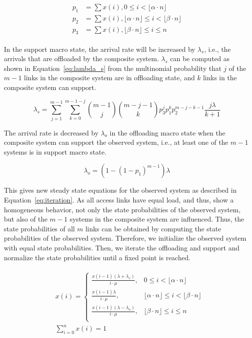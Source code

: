 \begin{align}
\begin{split}
p_1 &= \sum x(i),  0 \leq i < \lfloor\alpha\cdot n\rfloor \\
p_2 &= \sum x(i), \lfloor\alpha\cdot n\rfloor\leq i < \lfloor\beta\cdot n\rfloor \\
p_3 &= \sum x(i), \lfloor\beta\cdot n\rfloor \leq i \leq n
\end{split}
\label{eq:macro}
\end{align}

In the support macro state, the arrival rate will be increased by $\lambda_s$, i.e., the arrivals that are offloaded by the composite system. $\lambda_s$ can be computed as shown in Equation~\ref{eq:lambda_s} from the multinomial probability that $j$ of the $m-1$ links in the composite system are in offloading state, and $k$ links in the composite system can support.

\small
\begin{equation}
\lambda_{s} = \sum_{j=1}^{m-1}\sum_{k=0}^{m-1-j} \binom{m-1}{j}\binom{m-j-1}{k}p^j_3 p^k_1 p_2^{m-j-k-1}\frac{j\lambda}{k+1}
\label{eq:lambda_s}
\end{equation}
\normalsize

The arrival rate is decreased by $\lambda_o$ in the offloading macro state when the composite system can support the observed system, i.e., at least one of the $m-1$ systems is in support macro state.

\begin{equation}
\lambda_{o} = (1-(1-p_1)^{m-1})\lambda
\end{equation}

This gives new steady state equations for the observed system as described in Equation~\ref{eq:iteration}. As all access links have equal load, and thus, show a homogeneous behavior, not only the state probabilities of the observed system, but also of the $m-1$ systems in the composite system are influenced. Thus, the state probabilities of all $m$ links can be obtained by computing the state probabilities of the observed system. Therefore, we initialize the observed system with equal state probabilities. Then, we iterate the offloading and support and normalize the state probabilities  until a fixed point is reached.

\begin{align}
\begin{split}
&x(i)=
\begin{cases}
\frac{x(i-1)(\lambda+\lambda_s)}{i\cdot\mu}, &0\leq i < \lfloor\alpha\cdot n\rfloor \\
\frac{x(i-1)\lambda}{i\cdot\mu}, &\lfloor\alpha\cdot n\rfloor\leq i < \lfloor\beta\cdot n\rfloor \\
\frac{x(i-1)(\lambda-\lambda_o)}{i\cdot\mu}, &\lfloor\beta\cdot n\rfloor \leq i \leq n \\
\end{cases}\\
&\sum_{i=0}^n x(i) = 1
\end{split}
\label{eq:iteration}
\end{align}

